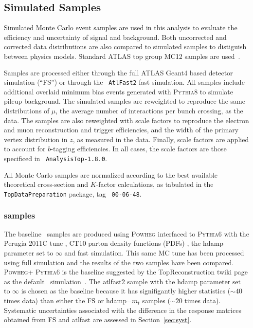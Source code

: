 \subsection{Simulated Samples}

Simulated Monte Carlo event samples are used in this analysis to evaluate the efficiency and uncertainty of signal and background.  Both uncorrected and corrected data distributions are also compared to simulated samples to distiguish between physics models. 
Standard ATLAS top group MC12 samples are used~\cite{topmc}.%

Samples are processed either through the full ATLAS Geant4\cite{bib:g4} based detector simulation (``FS'') or through the \texttt{ AtlFast2}\cite{atlfast2} fast simulation. All samples include additional overlaid minimum bias events generated with \textsc{  Pythia8} \cite{pythia8} to simulate pileup background. 
The simulated samples are reweighted to reproduce the same distributions of $\mu$, the average number of interactions per bunch crossing, as the data. The samples are also reweighted with scale factors to reproduce the electron and muon reconstruction and trigger efficiencies, and the width of the primary vertex distribution in $z$, as measured in the data. Finally, scale factors are applied to account for $b$-tagging efficiencies.  In all cases,
the scale factors are those specificed in \texttt{ AnalysisTop-1.8.0}.

All Monte Carlo samples are normalized according to the best available theoretical cross-section and $K$-factor calculations, as tabulated in the \texttt{ TopDataPreparation} package, tag \texttt{ 00-06-48}.

\subsubsection{\ttbar samples}\label{ss:mcsignal}

The baseline \ttbar\ samples are produced using \textsc{  Powheg} \cite{Powheg, Powheg2, Powheg3, Powheg4} interfaced to \textsc{  Pythia6} \cite{pythia6} with the Perugia 2011C tune \cite{perugia}, CT10 parton density functions (PDFs) \cite{cttenpdf}, the hdamp parameter set to $\infty$ and fast simulation.  
This same MC tune has been processed using full simulation and the results of the two samples have been compared.
\textsc{  Powheg}+\textsc{  Pythia6} is the baseline suggested by the TopReconstruction twiki page as the default \ttbar\ simulation~\cite{topmc}. The atlfast2 sample with the hdamp parameter set to $\infty$ is chosen as the baseline because it has signifigantly higher statistics ($\sim 40$ times data) than either the FS or hdamp=$m_t$ samples ($\sim 20$ times data).
Systematic uncertainties associated with the difference in the response matrices obtained from FS and atlfast are
assessed in Section~\ref{sec:syst}.


